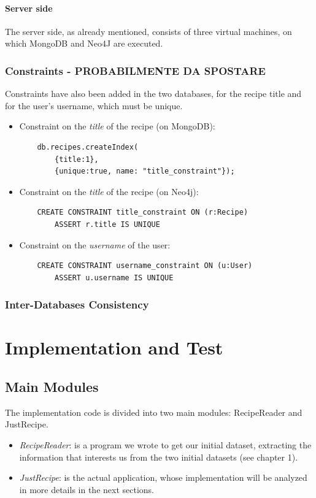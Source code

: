 \documentclass[a4paper]{report}
\begin{document}
\subsubsection{Server side}
The server side, as already mentioned, consists of three virtual machines, on which MongoDB and Neo4J are executed.


\subsection{Constraints - PROBABILMENTE DA SPOSTARE}
Constraints have also been added in the two databases, for the recipe title and for the user's username, which must be unique.
\begin{itemize}
\item Constraint on the \emph{title} of the recipe (on MongoDB): 
\lstset{ language=java}
\begin{lstlisting}
	db.recipes.createIndex(
		{title:1},
		{unique:true, name: "title_constraint"});	
\end{lstlisting} 
\item Constraint on the \emph{title} of the recipe (on Neo4j): 
\begin{lstlisting}
	CREATE CONSTRAINT title_constraint ON (r:Recipe) 
		ASSERT r.title IS UNIQUE	
\end{lstlisting} 
\item Constraint on the \emph{username} of the user: 
\lstset{ language=java}
\begin{lstlisting}
	CREATE CONSTRAINT username_constraint ON (u:User) 
		ASSERT u.username IS UNIQUE	
\end{lstlisting} 
\end{itemize}

\subsection{Inter-Databases Consistency}

\chapter{Implementation and Test}
\section{Main Modules}
The implementation code is divided into two main modules: RecipeReader and JustRecipe.
 \begin{itemize}
	\item \emph{RecipeReader}:  is a program we wrote to get our initial dataset, extracting the information that interests us from the two initial datasets (see chapter 1). 
	\item \emph{JustRecipe}:  is the actual application, whose implementation will be analyzed in more details in the next sections. 
\end{itemize}
\end{document}
